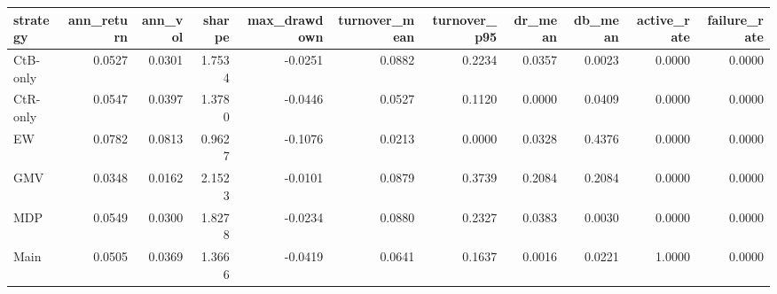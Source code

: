 \begin{tabular}{lrrrrrrrrrr}
\toprule
strategy & ann_return & ann_vol & sharpe & max_drawdown & turnover_mean & turnover_p95 & dr_mean & db_mean & active_rate & failure_rate \\
\midrule
CtB-only & 0.0527 & 0.0301 & 1.7534 & -0.0251 & 0.0882 & 0.2234 & 0.0357 & 0.0023 & 0.0000 & 0.0000 \\
CtR-only & 0.0547 & 0.0397 & 1.3780 & -0.0446 & 0.0527 & 0.1120 & 0.0000 & 0.0409 & 0.0000 & 0.0000 \\
EW & 0.0782 & 0.0813 & 0.9627 & -0.1076 & 0.0213 & 0.0000 & 0.0328 & 0.4376 & 0.0000 & 0.0000 \\
GMV & 0.0348 & 0.0162 & 2.1523 & -0.0101 & 0.0879 & 0.3739 & 0.2084 & 0.2084 & 0.0000 & 0.0000 \\
MDP & 0.0549 & 0.0300 & 1.8278 & -0.0234 & 0.0880 & 0.2327 & 0.0383 & 0.0030 & 0.0000 & 0.0000 \\
Main & 0.0505 & 0.0369 & 1.3666 & -0.0419 & 0.0641 & 0.1637 & 0.0016 & 0.0221 & 1.0000 & 0.0000 \\
\bottomrule
\end{tabular}
